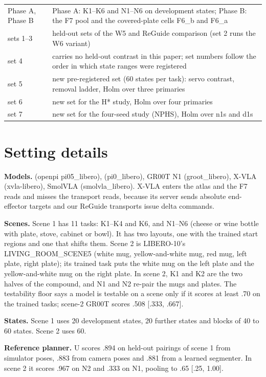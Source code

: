 \begin{table}[h]
\begin{tabular}{@{}lp{5.6in}@{}}
Phase A, Phase B & Phase A: K1--K6 and N1--N6 on development states; Phase B: the F7 pool and the covered-plate cells F6\_b and F6\_a \\
sets 1--3 & held-out sets of the W5 and ReGuide comparison (set 2 runs the W6 variant) \\
set 4 & carries no held-out contrast in this paper; set numbers follow the order in which state ranges were registered \\
set 5 & new pre-registered set (60 states per task): \pizero{} servo contrast, removal ladder, Holm over three primaries \\
set 6 & new set for the H* study, Holm over four primaries \\
set 7 & new set for the four-seed study (NPHS), Holm over n1s and d1s \\
\bottomrule
\end{tabular}
\end{table}

\section{Setting details}
\label{app:A}

\textbf{Models.} \pifive{} (openpi pi05\_libero), \pizero{} (pi0\_libero), GR00T N1 (groot\_libero), X-VLA (xvla-libero), SmolVLA (smolvla\_libero). X-VLA enters the atlas and the F7 reads and misses the transport reads, because its server sends absolute end-effector targets and our ReGuide transports issue delta commands.

\textbf{Scenes.} Scene 1 has 11 tasks: K1--K4 and K6, and N1--N6 (cheese or wine bottle with plate, stove, cabinet or bowl). It has two layouts, one with the trained start regions and one that shifts them. Scene 2 is LIBERO-10's LIVING\_ROOM\_SCENE5 (white mug, yellow-and-white mug, red mug, left plate, right plate); its trained task puts the white mug on the left plate and the yellow-and-white mug on the right plate. In scene 2, K1 and K2 are the two halves of the compound, and N1 and N2 re-pair the mugs and plates. The testability floor says a model is testable on a scene only if it scores at least .70 on the trained tasks; scene-2 GR00T scores .508 [.333, .667].

\textbf{States.} Scene 1 uses 20 development states, 20 further states and blocks of 40 to 60 states. Scene 2 uses 60.

\textbf{Reference planner.} U scores .894 on held-out pairings of scene 1 from simulator poses, .883 from camera poses and .881 from a learned segmenter. In scene 2 it scores .967 on N2 and .333 on N1, pooling to .65 [.25, 1.00].


